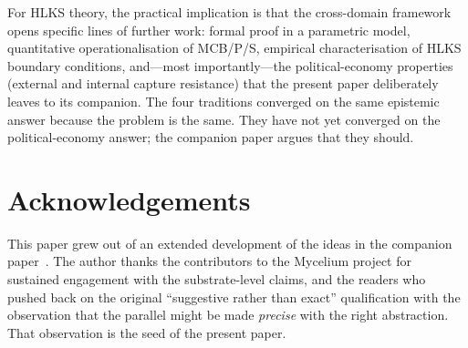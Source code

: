 \documentclass[11pt]{article}
\theoremstyle{definition}
\theoremstyle{plain}
\theoremstyle{plain}
\begin{document}
For HLKS theory, the practical implication is that the cross-domain
framework opens specific lines of further work: formal proof in a parametric
model, quantitative operationalisation of MCB/P/S, empirical
characterisation of HLKS boundary conditions, and---most importantly---the
political-economy properties (external and internal capture resistance) that
the present paper deliberately leaves to its companion. The four traditions
converged on the same epistemic answer because the problem is the same. They
have not yet converged on the political-economy answer; the companion paper
argues that they should.

\section*{Acknowledgements}

This paper grew out of an extended development of the ideas in the companion
paper~\cite{nicholson2026}. The author thanks the contributors to the
Mycelium project for sustained engagement with the substrate-level claims,
and the readers who pushed back on the original ``suggestive rather than
exact'' qualification with the observation that the parallel might be made
\emph{precise} with the right abstraction. That observation is the seed of the
present paper.


\end{document}
